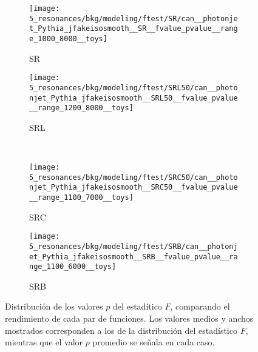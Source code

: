 \begin{figure}[ht!]
    \centering
    \begin{subfigure}[h]{0.49\linewidth}
        \centering
        \texttt{[image: 5\_resonances/bkg/modeling/ftest/SR/can\_\_photonjet\_Pythia\_jfakeisosmooth\_\_SR\_\_fvalue\_pvalue\_\_range\_1000\_8000\_\_toys]}
        \caption{SR}
    \end{subfigure}
    \begin{subfigure}[h]{0.49\linewidth}
        \centering
        \texttt{[image: 5\_resonances/bkg/modeling/ftest/SRL50/can\_\_photonjet\_Pythia\_jfakeisosmooth\_\_SRL50\_\_fvalue\_pvalue\_\_range\_1200\_8000\_\_toys]}
        \caption{SRL}
    \end{subfigure}
    \\
    \begin{subfigure}[h]{0.49\linewidth}
        \centering
        \texttt{[image: 5\_resonances/bkg/modeling/ftest/SRC50/can\_\_photonjet\_Pythia\_jfakeisosmooth\_\_SRC50\_\_fvalue\_pvalue\_\_range\_1100\_7000\_\_toys]}
        \caption{SRC}
    \end{subfigure}
    \begin{subfigure}[h]{0.49\linewidth}
        \centering
        \texttt{[image: 5\_resonances/bkg/modeling/ftest/SRB/can\_\_photonjet\_Pythia\_jfakeisosmooth\_\_SRB\_\_fvalue\_pvalue\_\_range\_1100\_6000\_\_toys]}
        \caption{SRB}
    \end{subfigure}
    \caption{Distribución de los valores \(p\) del estadítico \(F\), comparando el rendimiento de cada par de funciones. Los valores medios y anchos mostrados corresponden a los de la distribución del estadístico \(F\), mientras que el valor \(p\) promedio se señala en cada caso.}
    \label{fig:bkg:modeling:preparation:ftest:ftest_pvalue}
\end{figure}


